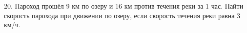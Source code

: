 20. Пароход прошёл 9 км по озеру и 16 км против течения реки за 1 час. Найти скорость парохода при движении по озеру, если скорость течения реки равна 3 км/ч.\\

